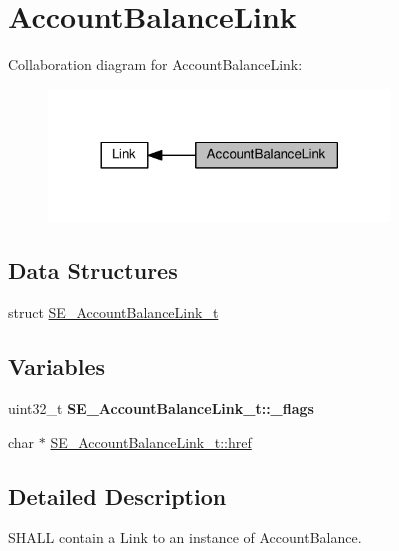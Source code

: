 \hypertarget{group__AccountBalanceLink}{}\section{Account\+Balance\+Link}
\label{group__AccountBalanceLink}
Collaboration diagram for Account\+Balance\+Link\+:\nopagebreak
\begin{figure}[H]
\begin{center}
\leavevmode
\includegraphics[width=257pt]{group__AccountBalanceLink}
\end{center}
\end{figure}
\subsection*{Data Structures}
\begin{DoxyCompactItemize}
\item 
struct \hyperlink{structSE__AccountBalanceLink__t}{S\+E\+\_\+\+Account\+Balance\+Link\+\_\+t}
\end{DoxyCompactItemize}
\subsection*{Variables}
\begin{DoxyCompactItemize}
\item 
\mbox{\label{group__AccountBalanceLink_ga89b8cbb8eea17a8d5dd258a73b1338e8}} 
uint32\+\_\+t {\bfseries S\+E\+\_\+\+Account\+Balance\+Link\+\_\+t\+::\+\_\+flags}
\item 
char $\ast$ \hyperlink{group__AccountBalanceLink_ga400d2097dbfecb5780a8067429c01c11}{S\+E\+\_\+\+Account\+Balance\+Link\+\_\+t\+::href}
\end{DoxyCompactItemize}


\subsection{Detailed Description}
S\+H\+A\+LL contain a Link to an instance of Account\+Balance. 

